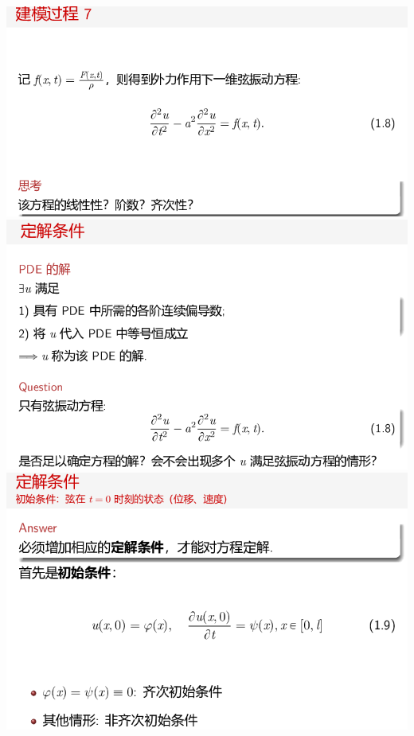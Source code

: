 \documentclass[11pt,a4paper]{ctexart}
\begin{document}
\begin{paracol}{2}
\includegraphics[width=\linewidth]{chap01_18.png}
\includegraphics[width=\linewidth]{chap01_19.png}
\includegraphics[width=\linewidth]{chap01_20.png}
\newpage


\end{paracol}
\end{document}
